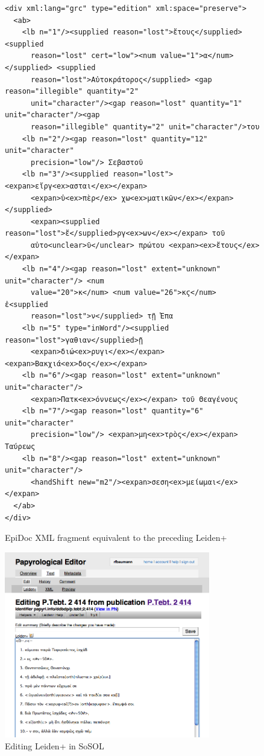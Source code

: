 \documentclass[]{article}
\begin{document}
\begin{figure}[!hbt]
  \begin{verbatim}
<div xml:lang="grc" type="edition" xml:space="preserve">
  <ab>
    <lb n="1"/><supplied reason="lost">ἔτους</supplied> <supplied
      reason="lost" cert="low"><num value="1">α</num> </supplied> <supplied
      reason="lost">Αὐτοκράτορος</supplied> <gap reason="illegible" quantity="2"
      unit="character"/><gap reason="lost" quantity="1" unit="character"/><gap
      reason="illegible" quantity="2" unit="character"/>του
    <lb n="2"/><gap reason="lost" quantity="12" unit="character"
      precision="low"/> Σεβαστοῦ
    <lb n="3"/><supplied reason="lost"><expan>εἴργ<ex>ασται</ex></expan>
      <expan>ὑ<ex>πὲρ</ex> χω<ex>ματικῶν</ex></expan></supplied>
      <expan><supplied reason="lost">ἔ</supplied>ργ<ex>ων</ex></expan> τοῦ
      αὐτο<unclear>ῦ</unclear> πρώτου <expan><ex>ἔτους</ex></expan>
    <lb n="4"/><gap reason="lost" extent="unknown" unit="character"/> <num
      value="20">κ</num> <num value="26">κϛ</num> ἐ<supplied
      reason="lost">ν</supplied> τῇ Ἐπα
    <lb n="5" type="inWord"/><supplied reason="lost">γαθιαν</supplied>ῇ
      <expan>διώ<ex>ρυγι</ex></expan> <expan>Βακχιά<ex>δος</ex></expan>
    <lb n="6"/><gap reason="lost" extent="unknown" unit="character"/>
      <expan>Πατκ<ex>όννεως</ex></expan> τοῦ Θεαγένους
    <lb n="7"/><gap reason="lost" quantity="6" unit="character"
      precision="low"/> <expan>μη<ex>τρὸς</ex></expan> Ταύρεως
    <lb n="8"/><gap reason="lost" extent="unknown" unit="character"/>
      <handShift new="m2"/><expan>σεση<ex>μείωμαι</ex></expan>
  </ab>
</div>
  \end{verbatim}
  \caption{EpiDoc XML fragment equivalent to the preceding Leiden+\label{epidoc}}
\end{figure}

\begin{figure}[!hb]
  \centering
  \includegraphics[width=0.8\textwidth]{images/leidenedit.png}
  \caption{Editing Leiden+ in SoSOL\label{leidenedit}}
\end{figure}
\end{document}
